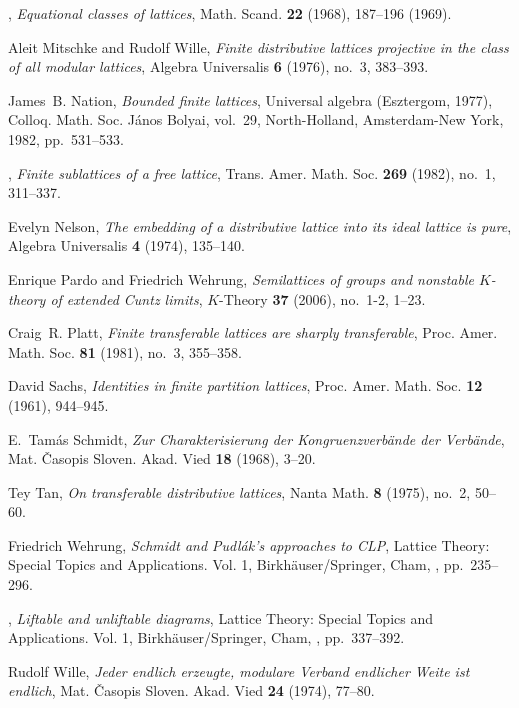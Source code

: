\documentclass[reqno]{amsart}
\numberwithin{equation}{section}
\theoremstyle{plain}
\theoremstyle{definition}
\theoremstyle{remark}
\numberwithin{figure}{section}
\numberwithin{table}{section}
\begin{document}
\begin{thebibliography}{10}
\bysame, \emph{Equational classes of lattices}, Math. Scand. \textbf{22}
  (1968), 187--196 (1969). 

Aleit Mitschke and Rudolf Wille, \emph{Finite distributive lattices projective
  in the class of all modular lattices}, Algebra Universalis \textbf{6} (1976),
  no.~3, 383--393. 

James~B. Nation, \emph{Bounded finite lattices}, Universal algebra
  ({E}sztergom, 1977), Colloq. Math. Soc. J\'anos Bolyai, vol.~29,
  North-Holland, Amsterdam-New York, 1982, pp.~531--533. 

\bysame, \emph{Finite sublattices of a free lattice}, Trans. Amer. Math. Soc.
  \textbf{269} (1982), no.~1, 311--337. 

Evelyn Nelson, \emph{The embedding of a distributive lattice into its ideal
  lattice is pure}, Algebra Universalis \textbf{4} (1974), 135--140.

Enrique Pardo and Friedrich Wehrung, \emph{Semilattices of groups and nonstable
  {$K$}-theory of extended {C}untz limits}, $K$-Theory \textbf{37} (2006),
  no.~1-2, 1--23. 

Craig~R. Platt, \emph{Finite transferable lattices are sharply transferable},
  Proc. Amer. Math. Soc. \textbf{81} (1981), no.~3, 355--358. 

David Sachs, \emph{Identities in finite partition lattices}, Proc. Amer. Math.
  Soc. \textbf{12} (1961), 944--945. 

E.~Tam{\'a}s Schmidt, \emph{Zur {C}harakterisierung der {K}ongruenzverb\"ande
  der {V}erb\"ande}, Mat. \v Casopis Sloven. Akad. Vied \textbf{18} (1968),
  3--20. 

Tey Tan, \emph{On transferable distributive lattices}, Nanta Math. \textbf{8}
  (1975), no.~2, 50--60. 

Friedrich Wehrung, \emph{Schmidt and {P}udl\'ak's approaches to {CLP}}, Lattice
  {T}heory: {S}pecial {T}opics and {A}pplications. {V}ol. 1,
  Birkh\"auser/Springer, Cham, {}, pp.~235--296. 

\bysame, \emph{Liftable and unliftable diagrams}, Lattice {T}heory: {S}pecial
  {T}opics and {A}pplications. {V}ol. 1, Birkh\"auser/Springer, Cham,
  {}, pp.~337--392. 

Rudolf Wille, \emph{Jeder endlich erzeugte, modulare {V}erband endlicher
  {W}eite ist endlich}, Mat. \v Casopis Sloven. Akad. Vied \textbf{24} (1974),
  77--80. 

\end{thebibliography}
\end{document}
